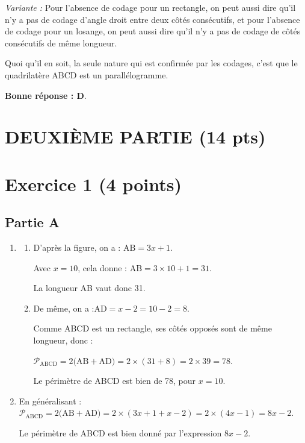 \documentclass[12pt,a4paper,french]{article}
\begin{document}
	\emph{Variante :} Pour l'absence de codage pour un rectangle, on peut aussi dire qu'il n'y a pas de codage d'angle droit entre deux côtés consécutifs, et pour l'absence de codage pour un losange, on peut aussi dire qu'il n'y a pas de codage de côtés consécutifs de même longueur.

	\medskip

	Quoi qu'il en soit, la seule nature qui est confirmée par les codages, c'est que le quadrilatère ABCD est un parallélogramme.

	\textbf{Bonne réponse : D}.

\section*{\centering DEUXIÈME PARTIE (14 pts)}

\section*{Exercice 1 (4 points)}
\subsection*{Partie A}
\begin{enumerate}
	\item \begin{enumerate}
		\item D'après la figure, on a : \quad $\mathrm{AB} = 3x + 1$.

		Avec $x = 10$, cela donne : \quad $\mathrm{AB} = 3 \times 10 + 1 = 31$.

		La longueur AB vaut donc 31.

		\item De même, on a :\quad $\mathrm{AD} = x - 2 = 10 - 2 = 8$.

		Comme ABCD est un rectangle, ses côtés opposés sont de même longueur, donc :

		$\mathcal{P}_{\mathrm{ABCD}} = 2\big(\mathrm{AB} + \mathrm{AD}\big) = 2\times (31 + 8) = 2\times 39 = 78$.

		Le périmètre de ABCD est bien de 78, pour $x=10$.
	\end{enumerate}
	\item En généralisant :\quad
	$\mathcal{P}_{\mathrm{ABCD}} = 2\big(\mathrm{AB} + \mathrm{AD}\big) = 2\times (3x + 1 + x - 2) = 2\times (4x - 1) = 8x - 2$.

	Le périmètre de ABCD est bien donné par l'expression \quad $8x-2$.
\end{enumerate}
\end{document}
